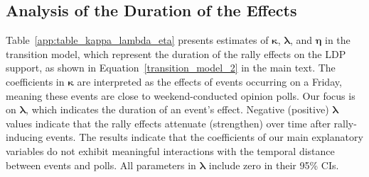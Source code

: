 \documentclass[12pt,letterpaper]{scrartcl}
\begin{document}
\clearpage
\subsection{Analysis of the Duration of the Effects}\label{app:subsec:duration}

Table~\ref{app:table_kappa_lambda_eta} presents estimates of $\bm{\kappa}$, $\bm{\lambda}$, and $\bm{\eta }$ in the transition model, which represent the duration of the rally effects on the LDP support, as shown in Equation~\eqref{transition_model_2} in the main text. The coefficients in $\bm{\kappa}$ are interpreted as the effects of events occurring on a Friday, meaning these events are close to weekend-conducted opinion polls. Our focus is on $\bm{\lambda}$, which indicates the duration of an event's effect. Negative (positive) $\bm{\lambda}$ values indicate that the rally effects attenuate (strengthen) over time after rally-inducing events. The results indicate that the coefficients of our main explanatory variables do not exhibit meaningful interactions with the temporal distance between events and polls. All parameters in $\bm{\lambda}$ include zero in their 95\% CIs.
\end{document}
